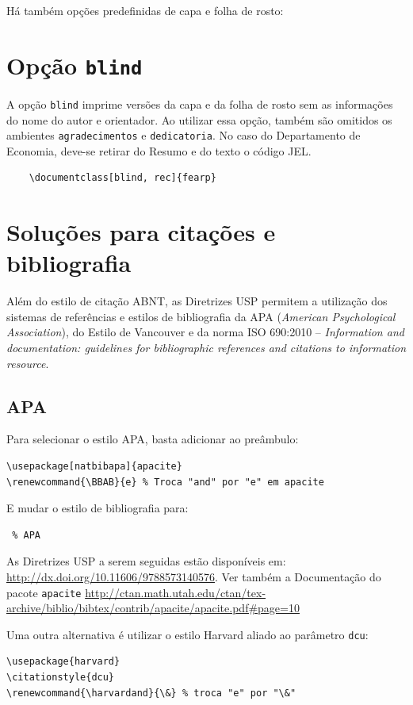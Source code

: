 \documentclass[rec]{fearp}
\begin{document}
Há também opções predefinidas de capa e folha de rosto:


\section{Opção \texttt{blind}}

A opção \texttt{blind} imprime versões da capa e da folha de rosto sem as informações do nome do autor e orientador. Ao utilizar essa opção, também são omitidos os ambientes \texttt{agradecimentos} e \texttt{dedicatoria}. No caso do Departamento de Economia, deve-se retirar do Resumo e do texto o código JEL. 
\begin{verbatim}
    \documentclass[blind, rec]{fearp}
\end{verbatim}

\section{Soluções para citações e bibliografia}

Além do estilo de citação ABNT, as Diretrizes USP permitem a utilização dos sistemas de referências e estilos de bibliografia da APA (\emph{American Psychological Association}), do Estilo de Vancouver e da norma ISO 690:2010 -- \emph{Information and documentation: guidelines for bibliographic references and citations to information resource}.

\subsection{APA}
Para selecionar o estilo APA, basta adicionar ao preâmbulo:
\begin{verbatim}
\usepackage[natbibapa]{apacite} 
\renewcommand{\BBAB}{e} % Troca "and" por "e" em apacite
\end{verbatim}
E mudar o estilo de bibliografia para: 
\begin{verbatim}
 % APA
\end{verbatim}

As Diretrizes USP a serem seguidas estão disponíveis em: \url{http://dx.doi.org/10.11606/9788573140576}. Ver também a Documentação do pacote \texttt{apacite} \url{http://ctan.math.utah.edu/ctan/tex-archive/biblio/bibtex/contrib/apacite/apacite.pdf#page=10}

Uma outra alternativa é utilizar o estilo Harvard aliado ao parâmetro \texttt{dcu}:

\begin{verbatim}
\usepackage{harvard} 
\citationstyle{dcu} 
\renewcommand{\harvardand}{\&} % troca "e" por "\&"
\end{verbatim}
\end{document}
